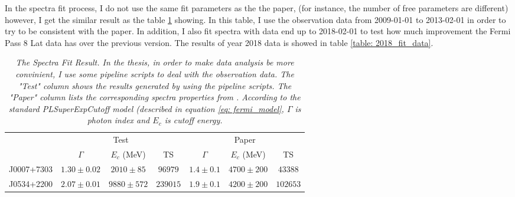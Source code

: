 \documentclass[12pt]{report}
\newcommand{\mycaption}[1]{\caption{\textit{\footnotesize #1}}}
\newcommand{\blackhref}[2]{
  \href{#1}{\color{black}{\textit{\small #2}}}
}
\begin{document}
            In the spectra fit process, I do not use the same fit parameters as the the paper, (for instance, 
            the number of free parameters are different)
            however, I get the similar result as the table \ref{table: previous_result_comparison} showing. In this table, 
            I use the observation data from 2009-01-01 to 2013-02-01 in order to try to be consistent with 
            the paper. In addition, I also fit spectra with data end up to 2018-02-01 to test how much 
            improvement the Fermi Pass 8 Lat data has over the previous version. The results of year 2018 data 
            is showed in table \ref{table: 2018_fit_data}.

            \vspace{1cm}
            \begin{table}[!ht]
              \centering
              \begin{tabular}{|c|c|c|c|c|c|c|} 
                \hline 
                & \multicolumn{3}{|c|}{Test} & \multicolumn{3}{|c|}{Paper} \\ 
                \cline{2-7}
                & $\Gamma$ & $E_c$ (MeV) & TS & $\Gamma$ & $E_c$ (MeV) & TS \\ 
                \hline
                J0007+7303 & $1.30\pm0.02$ & $2010\pm85$ & $96979$ & $1.4\pm0.1$ & $4700\pm200$ & $43388$  \\
                \hline 
                J0534+2200 & $2.07\pm0.01$ & $9880\pm572$ & $239015$ & $1.9\pm0.1$ & $4200\pm200$ & $102653$  \\
                \hline
              \end{tabular}
              \mycaption{The Spectra Fit Result. In the thesis, in order to make data analysis be more 
                convinient, I use some pipeline scripts to deal with the observation data. The "Test" column
                shows the results generated by using the pipeline scripts. The "Paper" column lists the 
                corresponding spectra properties from \blackhref{https://arxiv.org/abs/1305.4385}{the paper}.
                According to the standard PLSuperExpCutoff model (described in equation \ref{eq: fermi_model}, 
                $\Gamma$ is photon index and $E_c$ is cutoff energy.}
              \label{table: previous_result_comparison}
            \end{table}
            \vspace{1cm}            
\end{document}
